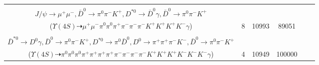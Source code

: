 \documentclass[landscape]{article}
\newcounter{rownumbers}
\newcommand\rn{\stepcounter{rownumbers}\arabic{rownumbers}}
\newcommand{\EOLP}{\\ \hline} %
\newcommand{\topoTags}[1]{#1} %
\begin{document}
\begin{longtable}{clcccc}
\rn & \makecell[l]{ $ 
\Upsilon(4S) \rightarrow B^{+} B^{-} ,
B^{+} \rightarrow K^{+} X_{1}(3872) ,
B^{-} \rightarrow K^{-} X_{1}(3872) ,
X_{1}(3872) \rightarrow \rho^{0} J/\psi ,
X_{1}(3872) \rightarrow \bar{D}^{0} D^{*0} ,
\rho^{0} \rightarrow \pi^{+} \pi^{-} ,
$ \\ $
J/\psi \rightarrow \mu^{+} \mu^{-} ,
\bar{D}^{0} \rightarrow \pi^{0} \pi^{-} K^{+} ,
D^{*0} \rightarrow \bar{D}^{0} \gamma ,
\bar{D}^{0} \rightarrow \pi^{0} \pi^{-} K^{+} 
$ \\ ($
\Upsilon(4S) \dashrightarrow \mu^{+} \mu^{-} \pi^{0} \pi^{0} \pi^{+} \pi^{-} \pi^{-} \pi^{-} K^{+} K^{+} K^{+} K^{-} \gamma 
$) } & \topoTags{8 & }10993 & 89051 \EOLP

\rn & \makecell[l]{ $ 
\Upsilon(4S) \rightarrow B^{+} B^{-} ,
B^{+} \rightarrow K^{+} X_{1}(3872) ,
B^{-} \rightarrow K^{-} X_{1}(3872) ,
X_{1}(3872) \rightarrow D^{0} \bar{D}^{*0} ,
X_{1}(3872) \rightarrow \bar{D}^{0} D^{*0} ,
D^{0} \rightarrow \pi^{+} \pi^{+} \pi^{-} K^{-} ,
$ \\ $
\bar{D}^{*0} \rightarrow D^{0} \gamma ,
\bar{D}^{0} \rightarrow \pi^{0} \pi^{-} K^{+} ,
D^{*0} \rightarrow \pi^{0} \bar{D}^{0} ,
D^{0} \rightarrow \pi^{+} \pi^{+} \pi^{-} K^{-} ,
\bar{D}^{0} \rightarrow \pi^{0} \pi^{-} K^{+} 
$ \\ ($
\Upsilon(4S) \dashrightarrow \pi^{0} \pi^{0} \pi^{0} \pi^{+} \pi^{+} \pi^{+} \pi^{+} \pi^{-} \pi^{-} \pi^{-} \pi^{-} K^{+} K^{+} K^{+} K^{-} K^{-} K^{-} \gamma 
$) } & \topoTags{4 & }10949 & 100000 \\ \hline

\end{longtable}
\end{document}
